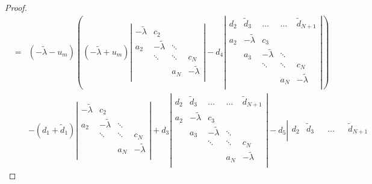 \documentclass[a4paper, 11pt]{article}
\begin{document}
\begin{proof}
\begin{eqnarray*}
        &=& (-\widetilde{\lambda} - u_m) \left( (-\widetilde{\lambda} + u_m)  \left|
        \begin{array}{cccc}
            -\widetilde{\lambda} & c_2  &  &   \\
            a_2 & -\widetilde{\lambda} & \ddots  &   \\
            & \ddots & \ddots & c_N \\
            &  & a_N & -\widetilde{\lambda}   \\
        \end{array}
        \right| -d_4  \left|
        \begin{array}{ccccc}
            d_2 & \widetilde{d}_{3} & \dots & \dots & \widetilde{d}_{{N+1}}\\
            a_2 &  -\widetilde{\lambda} & c_3  &  & \\
            & a_3 & -\widetilde{\lambda} & \ddots &\\
            & & \ddots & \ddots & c_N \\
            & &   & a_N & -\widetilde{\lambda}   \\
        \end{array}
        \right| \right) \\
        && - (d_1+\widetilde{d}_{{1}})  \left|
        \begin{array}{cccc}
            -\widetilde{\lambda} & c_2  &  &   \\
            a_2 & -\widetilde{\lambda} & \ddots  &   \\
            & \ddots & \ddots & c_N \\
            &  & a_N & -\widetilde{\lambda}   \\
        \end{array}
        \right| + d_3  \left|
        \begin{array}{ccccc}
            d_2 & \widetilde{d}_{3} & \dots & \dots & \widetilde{d}_{{N+1}}\\
            a_2 &  -\widetilde{\lambda} & c_3  &  & \\
            & a_3 & -\widetilde{\lambda} & \ddots &\\
            & & \ddots & \ddots & c_N \\
            & &   & a_N & -\widetilde{\lambda}   \\
        \end{array}
        \right| - d_5 \left|
        \begin{array}{cccccc}
            d_2 & \widetilde{d}_{3} & & \dots & & \widetilde{d}_{{N+1}}\\

\end{array}
\end{eqnarray*}
\end{proof}
\end{document}
